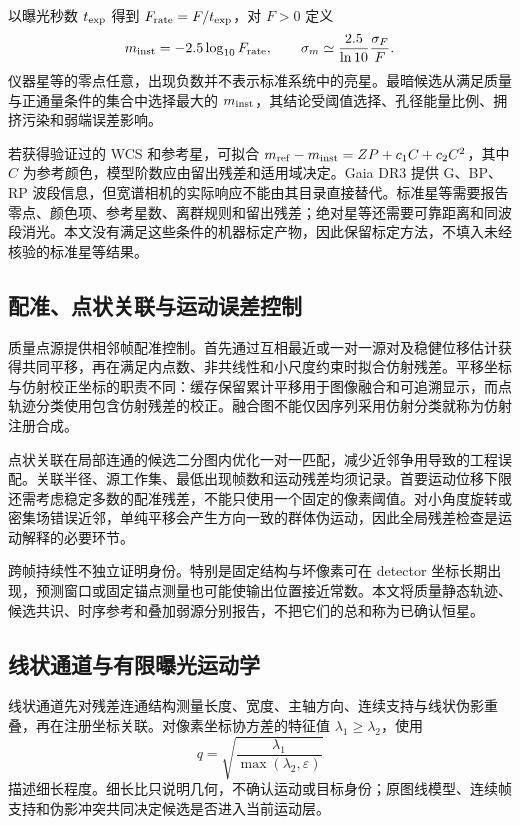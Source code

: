 \documentclass[UTF8,a4paper,11pt,fontset=windows]{ctexart}
\begin{document}
以曝光秒数 $t_{\rm exp}$ 得到 $F_{\rm rate}=F/t_{\rm exp}$，对 $F>0$ 定义
\begin{equation}
 m_{\rm inst}=-2.5\log_{10}F_{\rm rate},\qquad
 \sigma_m\simeq\frac{2.5}{\ln10}\frac{\sigma_F}{F}.
\end{equation}
仪器星等的零点任意，出现负数并不表示标准系统中的亮星。最暗候选从满足质量与正通量条件的集合中选择最大的 $m_{\rm inst}$，其结论受阈值选择、孔径能量比例、拥挤污染和弱端误差影响。

若获得验证过的 WCS 和参考星，可拟合 $m_{\rm ref}-m_{\rm inst}=ZP+c_1C+c_2C^2$，其中 $C$ 为参考颜色，模型阶数应由留出残差和适用域决定。Gaia DR3 提供 G、BP、RP 波段信息\cite{gaia}，但宽谱相机的实际响应不能由其目录直接替代。标准星等需要报告零点、颜色项、参考星数、离群规则和留出残差；绝对星等还需要可靠距离和同波段消光。本文没有满足这些条件的机器标定产物，因此保留标定方法，不填入未经核验的标准星等结果。

\subsection{配准、点状关联与运动误差控制}
质量点源提供相邻帧配准控制。首先通过互相最近或一对一源对及稳健位移估计获得共同平移，再在满足内点数、非共线性和小尺度约束时拟合仿射残差。平移坐标与仿射校正坐标的职责不同：缓存保留累计平移用于图像融合和可追溯显示，而点轨迹分类使用包含仿射残差的校正。融合图不能仅因序列采用仿射分类就称为仿射注册合成。

点状关联在局部连通的候选二分图内优化一对一匹配，减少近邻争用导致的工程误配。关联半径、源工作集、最低出现帧数和运动残差均须记录。首要运动位移下限还需考虑稳定多数的配准残差，不能只使用一个固定的像素阈值。对小角度旋转或密集场错误近邻，单纯平移会产生方向一致的群体伪运动，因此全局残差检查是运动解释的必要环节。

跨帧持续性不独立证明身份。特别是固定结构与坏像素可在 detector 坐标长期出现，预测窗口或固定锚点测量也可能使输出位置接近常数。本文将质量静态轨迹、候选共识、时序参考和叠加弱源分别报告，不把它们的总和称为已确认恒星。

\subsection{线状通道与有限曝光运动学}
线状通道先对残差连通结构测量长度、宽度、主轴方向、连续支持与线状伪影重叠，再在注册坐标关联。对像素坐标协方差的特征值 $\lambda_1\ge\lambda_2$，使用
\begin{equation}
 q=\sqrt{\frac{\lambda_1}{\max(\lambda_2,\varepsilon)}}
\end{equation}
描述细长程度。细长比只说明几何，不确认运动或目标身份；原图线模型、连续帧支持和伪影冲突共同决定候选是否进入当前运动层。
\end{document}
